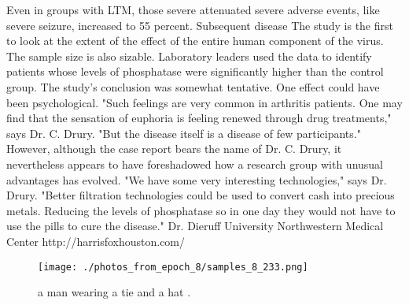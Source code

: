 \documentclass{article}%
\begin{document}
Even in groups with LTM, those severe attenuated severe adverse events, like severe seizure, increased to 55 percent.\newline%
Subsequent disease\newline%
The study is the first to look at the extent of the effect of the entire human component of the virus. The sample size is also sizable. Laboratory leaders used the data to identify patients whose levels of phosphatase were significantly higher than the control group.\newline%
The study's conclusion was somewhat tentative. One effect could have been psychological. "Such feelings are very common in arthritis patients. One may find that the sensation of euphoria is feeling renewed through drug treatments," says Dr. C. Drury. "But the disease itself is a disease of few participants."\newline%
However, although the case report bears the name of Dr. C. Drury, it nevertheless appears to have foreshadowed how a research group with unusual advantages has evolved. "We have some very interesting technologies," says Dr. Drury. "Better filtration technologies could be used to convert cash into precious metals. Reducing the levels of phosphatase so in one day they would not have to use the pills to cure the disease."\newline%
Dr. Dieruff University\newline%
Northwestern Medical Center\newline%
http://harrisfoxhouston.com/\newline%

%


\begin{figure}[h!]%
\centering%
\texttt{[image: ./photos\_from\_epoch\_8/samples\_8\_233.png]}%
\caption{a man wearing a tie and a hat .}%
\end{figure}

%
\end{document}
